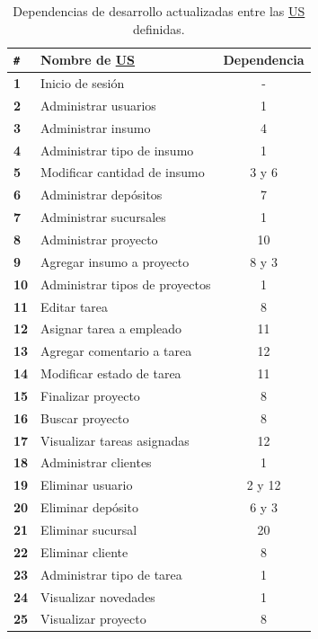 \documentclass[a4paper, 12pt,twoside]{report}  %
\numberwithin{equation}{subsection} %
\begin{document}
\begin{table}[h!]
	\centering
	\begin{tabular}{ |p{0.5cm}|p{9cm}|c|  }
		\hline
		\verb|#|& \textbf{Nombre de \hyperlink{US}{US}}& \textbf{Dependencia} \\
		\hline
		\textbf{1} & \cellcolor{marca_US_realizada_anterior}Inicio de sesión & - \\
		\hline
		\textbf{2} & \cellcolor{marca_US_realizada_anterior}Administrar usuarios & 1 \\
		\hline
		\textbf{3} & \cellcolor{marca_US_realizada}Administrar insumo & 4 \\
		\hline
		\textbf{4} & \cellcolor{marca_US_realizada}Administrar tipo de insumo & 1 \\
		\hline
		\textbf{5} & \cellcolor{marca_US_realizada}Modificar cantidad de insumo & 3 y 6 \\
		\hline
		\textbf{6} & \cellcolor{marca_US_realizada_anterior}Administrar depósitos & 7 \\
		\hline
		\textbf{7} & \cellcolor{marca_US_realizada_anterior}Administrar sucursales & 1 \\
		\hline
		\textbf{8} & Administrar proyecto & 10 \\
		\hline
		\textbf{9} & Agregar insumo a proyecto & 8 y 3 \\
		\hline
		\textbf{10} & Administrar tipos de proyectos & 1 \\
		\hline
		\textbf{11} & Editar tarea & 8 \\
		\hline
		\textbf{12} & Asignar tarea a empleado & 11\\
		\hline
		\textbf{13} & Agregar comentario a tarea & 12 \\
		\hline
		\textbf{14} & Modificar estado de tarea & 11 \\
		\hline
		\textbf{15} & Finalizar proyecto & 8 \\
		\hline
		\textbf{16} & Buscar proyecto & 8 \\
		\hline
		\textbf{17} & Visualizar tareas asignadas & 12 \\
		\hline
		\textbf{18} & \cellcolor{marca_US_realizada_anterior}Administrar clientes & 1 \\
		\hline
		\textbf{19} & Eliminar usuario & 2 y 12 \\
		\hline
		\textbf{20} & Eliminar depósito & 6 y 3 \\
		\hline
		\textbf{21} & Eliminar sucursal & 20 \\
		\hline
		\textbf{22} & Eliminar cliente & 8 \\
		\hline
		\textbf{23} & \cellcolor{marca_US_realizada}Administrar tipo de tarea & 1 
		\\
		\hline
		\textbf{24} & \cellcolor{marca_US_realizada}Visualizar novedades & 1 
		\\
		\hline
		\textbf{25} & Visualizar proyecto & 8 
		\\
		\hline
	\end{tabular}
	\caption{Dependencias de desarrollo actualizadas entre las \protect\hyperlink{US}{US} definidas.}
	\label{tabla_dependencias_us_it2}
\end{table}
\end{document}
